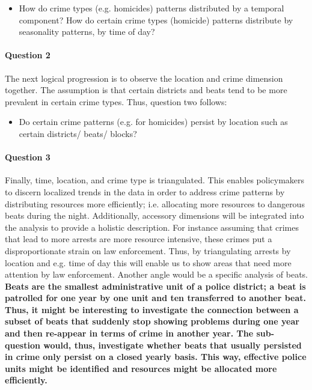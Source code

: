 \documentclass[a4paper]{article}
\begin{document}
\begin{itemize}
  \item How do crime types (e.g. homicides) patterns distributed by a temporal component? How do certain crime types (homicide) patterns distribute by seasonality patterns, by time of day?
\end{itemize}

\paragraph{Question 2} The next logical progression is to observe the location and crime dimension together. The assumption is that certain districts and beats tend to be more prevalent in certain crime types. Thus, question two follows:

\begin{itemize}
  \item Do certain crime patterns (e.g. for homicides) persist by location such as certain districts/ beats/ blocks?
\end{itemize}

\paragraph{Question 3} Finally, time, location, and crime type is triangulated. This enables policymakers to discern localized trends in the data in order to address crime patterns by distributing resources more efficiently; i.e. allocating more resources to dangerous beats during the night. Additionally, accessory dimensions will be integrated into the analysis to provide a holistic description. For instance assuming that crimes that lead to more arrests are more resource intensive, these crimes put a disproportionate strain on law enforcement. Thus, by triangulating arrests by location and e.g. time of day this will enable us to show areas that need more attention by law enforcement. Another angle would be a specific analysis of beats. \textbf{Beats are the smallest administrative unit of a police district; a beat is patrolled for one year by one unit and ten transferred to another beat. Thus, it might be interesting to investigate the connection between a subset of beats that suddenly stop showing problems during one year and then re-appear in terms of crime in another year. The sub-question would, thus, investigate whether beats that usually persisted in crime only persist on a closed yearly basis. This way, effective police units might be identified and resources might be allocated more efficiently.}
 
\end{document}
